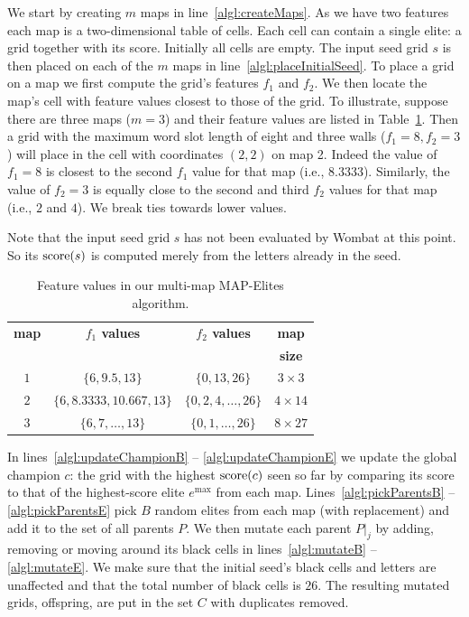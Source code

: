 We start by creating $m$ maps in line~\ref{algl:createMaps}. As we have two features each map is a two-dimensional table of cells. Each cell can contain a single elite: a grid together with its score. Initially all cells are empty. The input seed grid $s$ is then placed on each of the $m$ maps in line~\ref{algl:placeInitialSeed}. To place a grid on a map we first compute the grid's features $f_1$ and $f_2$. We then locate the map's cell with feature values closest to those of the grid. To illustrate, suppose there are three maps ($m=3$) and their feature values are listed in Table~\ref{tab:mrme}. Then a grid with the maximum word slot length of eight and three walls ($f_1 = 8, f_2 = 3$) will place in the cell with coordinates $(2,2)$ on map 2. Indeed the value of $f_1 = 8$ is closest to the second $f_1$ value for that map (i.e., $8.3333$). Similarly, the value of $f_2 = 3$ is equally close to the second and third $f_2$ values for that map (i.e., $2$ and $4$). We break ties towards lower values. 

Note that the input seed grid $s$ has not been evaluated by {\sc Wombat} at this point. So its $\operatorname{score}(s)$ is computed merely from the letters already in the seed.

\begin{table}
{\small\centering
\begin{tabular}{c|c|c|c}
\toprule
{\bf map} & {\bf $f_1$ values} & {\bf $f_2$ values} & {\bf map} \\
          &                    &                    & {\bf size} \\
\midrule
$1$ & $\{6,9.5,13\}$ & $\{0,13,26\}$ & $3 \times 3$ \\
$2$ & $\{6,8.3333,10.667,13\}$ & $\{0,2,4,\dots,26\}$ & $4 \times 14$\\
$3$ & $\{6,7,\dots,13\}$ & $\{0,1,\dots,26\}$ & $8 \times 27$\\
\bottomrule
\end{tabular}}
\caption{Feature values in our multi-map MAP-Elites algorithm.}
\label{tab:mrme}
\end{table}

In lines~\ref{algl:updateChampionB} -- \ref{algl:updateChampionE} we update the global champion $c$: the grid with the highest $\operatorname{score}(c)$ seen so far by comparing its score to that of the highest-score elite $e^{\max}$ from each map. Lines~\ref{algl:pickParentsB} -- \ref{algl:pickParentsE} pick $B$ random elites from each map (with replacement) and add it to the set of all parents $P$. We then mutate each parent $\left.P\right|_j$ by adding, removing or moving around its black cells in lines~\ref{algl:mutateB} -- \ref{algl:mutateE}. We make sure that the initial seed's black cells and letters are unaffected and that the total number of black cells is $26$. The resulting mutated grids, offspring, are put in the set $C$ with duplicates removed.

